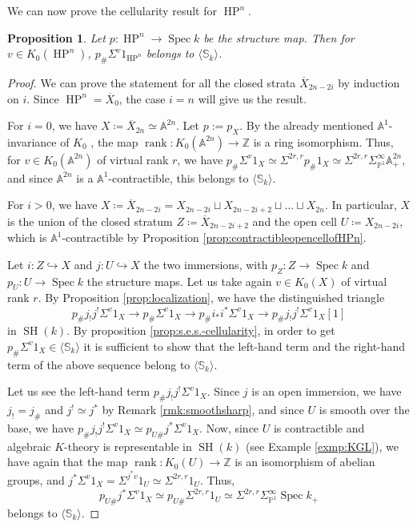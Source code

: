 \documentclass[10pt]{amsart}
\theoremstyle{definition}
\theoremstyle{plain}
\newtheorem{prop}[defn]{Proposition}
\numberwithin{equation}{section}
\newcommand{\0}{\emptyset}
\newcommand{\A}{{\mathbb A}}
\renewcommand{\P}{{\mathbb P}}
\newcommand{\Z}{{\mathbb Z}}
\newcommand{\HP}{{\operatorname{HP}}}
\newcommand{\Spec}{{\operatorname{Spec}}}
\newcommand{\SH}{{\operatorname{SH}}}
\newcommand{\rnk}{{\operatorname{rank}}}
\begin{document}
We can now prove the cellularity result for $\HP^n$.

\begin{prop}
\label{prop:vectorbundlesonHPn}
Let $p:\HP^n\to \Spec k$ be the structure map. Then for $v\in K_0(\HP^n)$, $p_{\#}\Sigma^v1_{\HP^n}$ belongs to $\langle \mathbb{S}_k \rangle$.
\end{prop}

\begin{proof}
We can prove the statement for all the closed strata $\overline{X}_{2n-2i}$ by induction on $i$. Since $\HP^n=\overline{X}_0$, the case $i=n$ will give us the result.

For $i=0$, we have $X \coloneqq \overline{X}_{2n}\simeq \mathbb{A}^{2n}$. Let $p :=p_X$. By the already mentioned $\A^1$-invariance of $K_0$ \cite[Corollary to Theorem 8]{Quillen:K}, the map $\rnk:K_0(\A^{2n})\to \Z$ is a ring isomorphism. Thus, for $v \in K_0(\A^{2n})$ of virtual rank $r$, we have $p_\#\Sigma^v1_X \simeq \Sigma^{2r,r}p_\#1_X \simeq \Sigma^{2r,r}\Sigma_{\P^1}^\infty \A^{2n}_+$, and since $\A^{2n}$ is a $\A^1$-contractible, this belongs to $\langle \mathbb{S}_k \rangle$.

For $i>0$, we have $X \coloneqq \overline{X}_{2n-2i}=X_{2n-2i}\sqcup X_{2n-2i+2} \sqcup \ldots \sqcup X_{2n}$. In particular, $X$ is the union of the closed stratum $Z \coloneqq \overline{X}_{2n-2i+2}$ and the open cell $U \coloneqq X_{2n-2i}$, which is $\A^1$-contractible by Proposition \ref{prop:contractibleopencellofHPn}.

Let $i:Z \hookrightarrow X$ and $j:U \hookrightarrow X$ the two immersions, with $p_Z:Z \to \Spec k$ and $p_U:U \to \Spec k$ the structure maps. Let us take again $v \in K_0(X)$ of virtual rank $r$. By Proposition \ref{prop:localization}, we have the distinguished triangle
$$p_{\#}j_!j^!\Sigma^v1_X \to p_{\#}\Sigma^v1_X \to p_{\#}i_*i^*\Sigma^v1_X \to p_{\#}j_!j^!\Sigma^v1_X[1]$$
in $\SH(k)$. By proposition \ref{prop:s.e.s.-cellularity}, in order to get $p_{\#}\Sigma^v1_X \in \langle \mathbb{S}_k \rangle$ it is sufficient to show that the left-hand term and the right-hand term of the above sequence belong to $\langle \mathbb{S}_k \rangle$.

 Let us see the left-hand term $p_{\#}j_!j^!\Sigma^v 1_X$. Since $j$ is an open immersion, we have $j_!=j_{\#}$ and $j^! \simeq j^*$ by Remark \ref{rmk:smoothsharp}, and since $U$ is smooth over the base, we have
 $p_{\#}j_!j^!\Sigma^v1_X\simeq p_{U\#}j^*\Sigma^v1_X.$ Now, since $U$ is contractible and algebraic $K$-theory is representable in $\SH(k)$ (see Example \ref{exmp:KGL}), we have again that the map
 $\rnk:K_0(U) \to \Z$ is an isomorphism of abelian groups, and $j^*\Sigma^v1_X=\Sigma^{j^*v}1_U \simeq \Sigma^{2r,r}1_U$. Thus,
 $$p_{U\#}j^*\Sigma^v1_X \simeq p_{U\#}\Sigma^{2r,r}1_U \simeq \Sigma^{2r,r}\Sigma^\infty_{\P^1}\Spec k_+$$
 belongs to $\langle \mathbb{S}_k \rangle$.


\end{proof}
\end{document}

